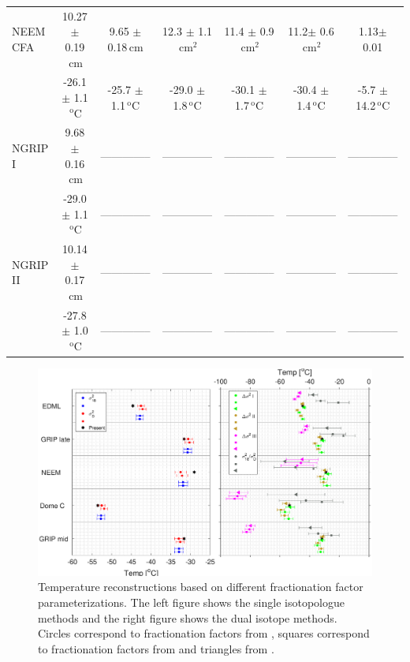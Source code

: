 \documentclass[11pt, draftcls, onecolumn]{IEEEtran} %
\numberwithin{equation}{section}
\numberwithin{table}{section}
\numberwithin{figure}{section}
\begin{document}
\begin{table}[]
\begin{tabular}{l c c c c c c}
		NEEM CFA&10.27 $\pm$ 0.19$\,\mathrm{cm}$& 9.65 $\pm$ 0.18$\,\mathrm{cm}$& 12.3 $\pm$ 1.1$\,\mathrm{cm}^2$& 11.4 $\pm$ 0.9$\,\mathrm{cm}^2$& 11.2$\pm$ 0.6$\,\mathrm{cm}^2$& 1.13$\pm$ 0.01\\
		& -26.1 $\pm$ 1.1$\,^\mathrm{o}$C & -25.7 $\pm$ 1.1$\,^\mathrm{o}$C& -29.0 $\pm$ 1.8$\,^\mathrm{o}$C& -30.1 $\pm$ 1.7$\,^\mathrm{o}$C& -30.4 $\pm$ 1.4$\,^\mathrm{o}$C & -5.7 $\pm$ 14.2$\,^\mathrm{o}$C\\
		
		NGRIP I&9.68 $\pm$ 0.16$\,\mathrm{cm}$& --------------&--------------& --------------&--------------&--------------\\
		& -29.0 $\pm$ 1.1$\,^\mathrm{o}$C & --------------&--------------&-------------- &--------------& --------------\\
		
		NGRIP II &10.14 $\pm$ 0.17$\,\mathrm{cm}$&-------------- &--------------&--------------&-------------- & --------------\\
		& -27.8 $\pm$ 1.0$\,^\mathrm{o}$C & --------------&-------------- &-------------- &-------------- &--------------\\
		\bottomrule	
	\end{tabular}
\end{table}



\begin{figure}[]
	\vspace*{2mm}
	\begin{center}
		\includegraphics[width=\textwidth]{Figure_14}
		\caption{Temperature reconstructions based on
			different fractionation factor parameterizations.
			The left figure shows the single isotopologue methods and 
			the right figure shows the dual isotope methods.
			Circles correspond to fractionation factors from \citet{Majoube1971,Merlivat1967}, 
			squares correspond to fractionation factors from \citet{Ellehoj2013} and  triangles from \citet{Lamb2015,Majoube1971}. }  
		\label{fig:fractionation_temps}
	\end{center}
\end{figure}
\end{document}
